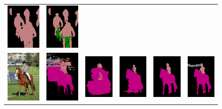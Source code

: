 \begin{figure}[p]
{\begin{tabular}{c c c c c c}
    \includegraphics[height=0.13\linewidth]{fig/val_crf_vis/strongweak/2007_001630.png} &
    \includegraphics[height=0.13\linewidth]{fig/val_crf_vis/cocomix/2007_001630.png} \\
    \includegraphics[height=0.15\linewidth]{fig/val_crf_vis/img/2007_005331.jpg} &
    \includegraphics[height=0.15\linewidth]{fig/val_crf_vis/adaweak/2007_005331.png} &
    \includegraphics[height=0.15\linewidth]{fig/val_crf_vis/bbox/2007_005331.png} &
    \includegraphics[height=0.15\linewidth]{fig/val_crf_vis/bbox_crf/2007_005331.png} &
    \includegraphics[height=0.15\linewidth]{fig/val_crf_vis/strongweak/2007_005331.png} &
    \includegraphics[height=0.15\linewidth]{fig/val_crf_vis/cocomix/2007_005331.png} \\

\end{tabular}}
\end{figure}

